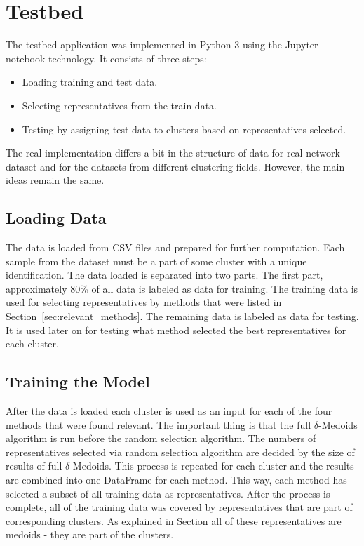 \documentclass[thesis=B,english]{FITthesis}[2012/10/20]
\begin{document}

\section{Testbed}
The testbed application was implemented in Python 3 using the Jupyter notebook technology.
It consists of three steps:
\begin{itemize}
    \item Loading training and test data.
    \item Selecting representatives from the train data.
    \item Testing by assigning test data to clusters based on representatives selected.
\end{itemize}
The real implementation differs a bit in the structure of data for real network dataset and for the datasets from different clustering fields.
However, the main ideas remain the same. \\

\subsection{Loading Data}\label{subsec:load_data}
The data is loaded from CSV files and prepared for further computation.
Each sample from the dataset must be a part of some cluster with a unique identification.
The data loaded is separated into two parts.
The first part, approximately 80\% of all data is labeled as data for training.
The training data is used for selecting representatives by methods that were listed in Section~\ref{sec:relevant_methods}.
The remaining data is labeled as data for testing.
It is used later on for testing what method selected the best representatives for each cluster.

\subsection{Training the Model}
After the data is loaded each cluster is used as an input for each of the four methods that were found relevant.
The important thing is that the full $\delta$-Medoids algorithm is run before the random selection algorithm.
The numbers of representatives selected via random selection algorithm are decided by the size of results of full $\delta$-Medoids. 
This process is repeated for each cluster and the results are combined into one DataFrame for each method.
This way, each method has selected a subset of all training data as representatives.
After the process is complete, all of the training data was covered by representatives that are part of corresponding clusters.
As explained in Section  all of these representatives are medoids - they are part of the clusters.
\end{document}
